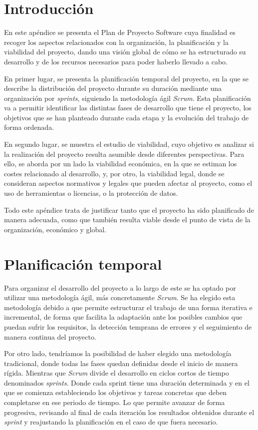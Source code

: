 
\section{Introducción}

En este apéndice se presenta el Plan de Proyecto Software cuya finalidad es recoger los aspectos relacionados con la organización, la planificación y la viabilidad del proyecto, dando una visión global de cómo se ha estructurado su desarrollo y de los recursos necesarios para poder haberlo llevado a cabo.

En primer lugar, se presenta la planificación temporal del proyecto, en la que se describe la distribución del proyecto durante su duración mediante una organización por \textit{sprints}, siguiendo la metodología ágil \textit{Scrum}. Esta planificación va a permitir identificar las distintas fases de desarrollo que tiene el proyecto, los objetivos que se han planteado durante cada etapa y la evolución del trabajo de forma ordenada.

En segundo lugar, se muestra el estudio de viabilidad, cuyo objetivo es analizar si la realización del proyecto resulta asumible desde diferentes perspectivas. Para ello, se aborda por un lado la viabilidad económica, en la que se estiman los costes relacionado al desarrollo, y, por otro, la viabilidad legal, donde se consideran aspectos normativos y legales que pueden afectar al proyecto, como el uso de herramientas o licencias, o la protección de datos.

Todo este apéndice trata de justificar tanto que el proyecto ha sido planificado de manera adecuada, como que también resulta viable desde el punto de vista de la organización, económico y global.

\section{Planificación temporal}

Para organizar el desarrollo del proyecto a lo largo de este se ha optado por utilizar una metodología ágil, más concretamente \textit{Scrum}. Se ha elegido esta metodología debido a que permite estructurar el trabajo de una forma iterativa e incremental, de forma que facilita la adaptación ante los posibles cambios que puedan sufrir los requisitos, la detección temprana de errores y el seguimiento de manera continua del proyecto.

Por otro lado, tendríamos la posibilidad de haber elegido una metodología tradicional, donde todas las fases quedan definidas desde el inicio de manera rígida. Mientras que \textit{Scrum} divide el desarrollo en ciclos cortos de tiempo denominados \textit{sprints}. Donde cada sprint tiene una duración determinada y en el que se comienza estableciendo los objetivos y tareas concretas que deben completarse en ese periodo de tiempo. Lo que permite avanzar de forma progresiva, revisando al final de cada iteración los resultados obtenidos durante el \textit{sprint} y reajustando la planificación en el caso de que fuera necesario.

